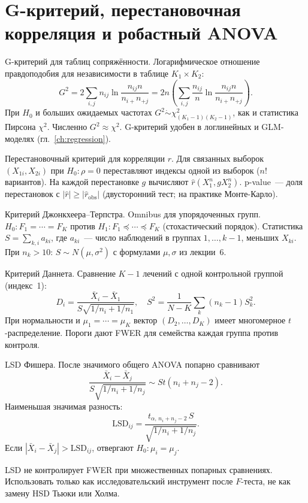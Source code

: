 \section{G-критерий, перестановочная корреляция и робастный ANOVA}

G-критерий для таблиц сопряжённости. Логарифмическое отношение правдоподобия для независимости в таблице $K_1\times K_2$: \[ G^2 = 2\sum_{i,j} n_{ij}\ln\frac{n_{ij}n}{n_{i+}n_{+j}} = 2n\!\left(\sum_{i,j}\frac{n_{ij}}{n}\ln\frac{n_{ij}n}{n_{i+}n_{+j}}\right).
\] При $H_0$ и больших ожидаемых частотах $G^2\dot\sim\chi^2_{(K_1-1)(K_2-1)}$, как и статистика Пирсона $\chi^2$. Численно $G^2\approx\chi^2$.
G-критерий удобен в логлинейных и GLM-моделях (гл.~\ref{ch:regression}).

Перестановочный критерий для корреляции $r$. Для связанных выборок $(X_{1i},X_{2i})$ при $H_0\colon\rho=0$ переставляют индексы одной из выборок ($n!$ вариантов).
На каждой перестановке $g$ вычисляют $\hat r(X_1^n, gX_2^n)$. p-value~--- доля перестановок с $|\hat r|\geq|\hat r_{\text{obs}}|$ (двусторонний тест; на практике Монте-Карло).

Критерий Джонкхеера--Терпстра. Omnibus для упорядоченных групп. $H_0\colon F_1=\cdots=F_K$ против $H_1\colon F_1\preceq\cdots\preceq F_K$ (стохастический порядок).
Статистика $S=\sum_{k,i} a_{ki}$, где $a_{ki}$~--- число наблюдений в группах $1,\ldots,k-1$, меньших $X_{ki}$.
При $n_k>10$: $S\sim N(\mu,\sigma^2)$ с формулами $\mu,\sigma$ из лекции~6.

Критерий Даннета. Сравнение $K-1$ лечений с одной контрольной группой (индекс~1): \[ D_i = \frac{\bar X_i-\bar X_1}{S\sqrt{1/n_i+1/n_1}},\quad S^2=\frac{1}{N-K}\sum_k (n_k-1)S_k^2.
\] При нормальности и $\mu_1=\cdots=\mu_K$ вектор $(D_2,\ldots,D_K)$ имеет многомерное $t$-распределение. Пороги дают FWER для семейства каждая группа против контроля.

LSD Фишера. После значимого общего ANOVA попарно сравнивают \[ \frac{\bar X_i-\bar X_j}{S\sqrt{1/n_i+1/n_j}}\sim St(n_i+n_j-2).
\] Наименьшая значимая разность: \[ \mathrm{LSD}_{ij}=\frac{t_{\alpha,\,n_i+n_j-2}\,S}{\sqrt{1/n_i+1/n_j}}.
\] Если $|\bar X_i-\bar X_j|>\mathrm{LSD}_{ij}$, отвергают $H_0\colon\mu_i=\mu_j$.

\begin{remark}
LSD не контролирует FWER при множественных попарных сравнениях. Использовать только как исследовательский инструмент после $F$-теста, не как замену HSD Тьюки или Холма.
\end{remark}

